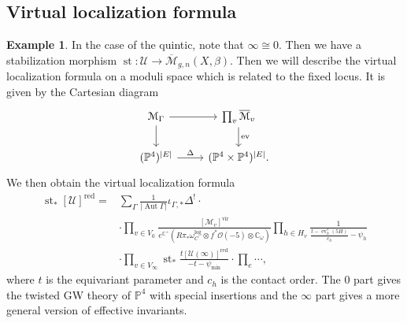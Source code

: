 \documentclass[10pt]{amsart}
\theoremstyle{definition}
\newtheorem{exm}[thm]{Example}
\theoremstyle{remark}
\theoremstyle{plain}
\theoremstyle{definition}
\theoremstyle{remark}
\newcommand{\C}{\mathbb{C}}
\renewcommand{\P}{\mathbb{P}}
\newcommand{\Mbar}{\overline{\mathcal{M}}}
\newcommand{\mc}[1]{\mathcal{#1}}
\newcommand{\mr}[1]{\mathrm{#1}}
\newcommand{\on}[1]{\operatorname{#1}}
\newcommand{\1}{\mathbf{1}}
\newcommand{\2}{\mathbf{2}}
\newcommand{\3}{\mathbf{3}}
\newcommand{\vir}{\mr{vir}}
\newcommand{\red}{\mr{red}}
\DeclareMathOperator{\Aut}{Aut}
\DeclareMathOperator{\ev}{ev}
\begin{document}
\subsection{Virtual localization formula}%
\label{sub:Virtual localization formula}


\begin{exm}
    In the case of the quintic, note that $\infty \cong 0$. Then we have a stabilization morphism $\on{st} \colon\mc{U} \to \Mbar_{g,n}(X,\beta)$. Then we will describe the virtual localization formula on a moduli space which is related to the fixed locus. It is given by the Cartesian diagram
    \begin{equation*}
    \begin{tikzcd}
        \mc{M}_{\Gamma} \ar{r} \ar{d} & \prod_v \Mbar_v \ar{d}{\ev} \\
        (\P^4)^{|E|} \ar{r}{\Delta} & (\P^4 \times \P^4)^{|E|}.
    \end{tikzcd}
    \end{equation*}
    We then obtain the virtual localization formula
    \begin{align*}
        \on{st}_* [\mc{U}]^{\red} ={}& \sum_{\Gamma} \frac{1}{|\Aut \Gamma|} \iota_{\Gamma,*} \Delta^! \cdot \\
        &\cdot \prod_{v \in V_0} \frac{[\mc{M}_v]^{\vir}}{e^{\C^{\times}}(R\pi_* \omega_C^{\log} \otimes f^* \mc{O}(-5) \otimes \C_{\omega})} \prod_{h \in H_v} \frac{1}{\frac{ t-\ev_h^*(5H) }{c_h} - \psi_h} \\
        &\cdot \prod_{v \in V_{\infty}} \on{st}_* \frac{t [\mc{U}(\infty)]^{\red}}{-t-\psi_{\min}} 
        \cdot \prod_{e} \cdots,
    \end{align*}
    where $t$ is the equivariant parameter and $c_h$ is the contact order. The $0$ part gives the twisted GW theory of $\P^4$ with special insertions and the $\infty$ part gives a more general version of effective invariants.
\end{exm}
\end{document}
